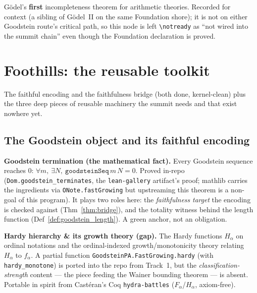 \begin{theorem}\label{thm:godel1}
  \notready
Gödel's \textbf{first} incompleteness theorem for arithmetic theories.  Recorded for context (a sibling
of Gödel~II on the same Foundation shore); it is not on either Goodstein route's critical path, so this
node is left \texttt{\textbackslash notready} as ``not wired into the summit chain'' even though the
Foundation declaration is proved.
\end{theorem}


\chapter{Foothills: the reusable toolkit}\label{chp:foothills}

The faithful encoding and the faithfulness bridge (both done, kernel-clean) plus the three deep pieces
of reusable machinery the summit needs and that exist nowhere yet.

\section{The Goodstein object and its faithful encoding}

\begin{theorem}\label{thm:goodstein_termination}
  \leanok
\textbf{Goodstein termination (the mathematical fact).}  Every Goodstein sequence reaches \(0\):
\(\forall m,\ \exists N,\ \texttt{goodsteinSeq}\,m\,N = 0\).  Proved in-repo
(\texttt{Dom.goodstein\_terminates}, the \texttt{lean-gallery} artifact's proof; mathlib carries the
ingredients via \texttt{ONote.fastGrowing} but upstreaming this theorem is a non-goal of this program).
It plays two roles here: the \emph{faithfulness target} the encoding is checked against
(Thm~\ref{thm:bridge}), and the totality witness behind the length function
(Def~\ref{def:goodstein_length}).  A green anchor, not an obligation.
\end{theorem}

\begin{definition}\label{def:hardy}
  \notready
\textbf{Hardy hierarchy \& its growth theory (gap).}  The Hardy functions \(H_\alpha\) on ordinal
notations and the ordinal-indexed growth/monotonicity theory relating \(H_\alpha\) to \(f_\alpha\).  A
partial function \texttt{GoodsteinPA.FastGrowing.hardy} (with \texttt{hardy\_monotone}) is ported into
the repo from Track~1, but the \emph{classification-strength} content --- the piece feeding the Wainer
bounding theorem --- is absent.  Portable in spirit from Castéran's Coq \texttt{hydra-battles}
(\(F_\alpha\)/\(H_\alpha\), axiom-free).
\end{definition}


